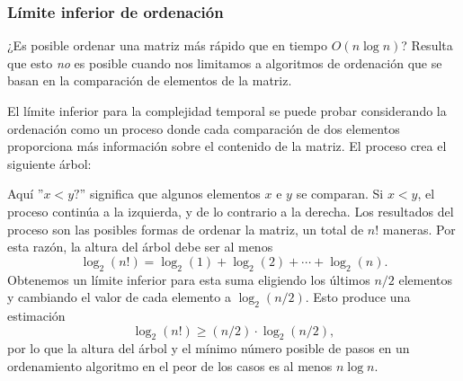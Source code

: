 \subsubsection{Límite inferior de ordenación}

¿Es posible ordenar una matriz más rápido
que en tiempo $O(n \log n)$?
Resulta que esto \emph{no} es posible
cuando nos limitamos a algoritmos de ordenación
que se basan en la comparación de elementos de la matriz.

El límite inferior para la complejidad temporal
se puede probar considerando la ordenación
como un proceso donde cada comparación de dos elementos
proporciona más información sobre el contenido de la matriz.
El proceso crea el siguiente árbol:

\begin{center}
\end{center}

Aquí ''$x<y?$'' significa que algunos elementos
$x$ e $y$ se comparan.
Si $x<y$, el proceso continúa a la izquierda,
y de lo contrario a la derecha.
Los resultados del proceso son las posibles
formas de ordenar la matriz, un total de $n!$ maneras.
Por esta razón, la altura del árbol
debe ser al menos
\[ \log_2(n!) = \log_2(1)+\log_2(2)+\cdots+\log_2(n).\]
Obtenemos un límite inferior para esta suma
eligiendo los últimos $n/2$ elementos y
cambiando el valor de cada elemento a $\log_2(n/2)$.
Esto produce una estimación
\[ \log_2(n!) \ge (n/2) \cdot \log_2(n/2),\]
por lo que la altura del árbol y el mínimo
número posible de pasos en un ordenamiento
algoritmo en el peor de los casos
es al menos $n \log n$.


